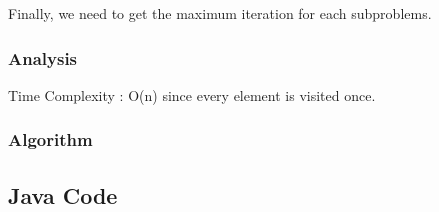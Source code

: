 \documentclass[]{book}
\begin{document}
Finally, we need to get the maximum iteration for each subproblems.

\hypertarget{analysis-26}{%
\subsubsection{Analysis}\label{analysis-26}}

Time Complexity : O(n) since every element is visited once.

\hypertarget{algorithm-26}{%
\subsubsection{Algorithm}\label{algorithm-26}}

\hypertarget{java-code-22}{%
\subsection{Java Code}\label{java-code-22}}
\end{document}

